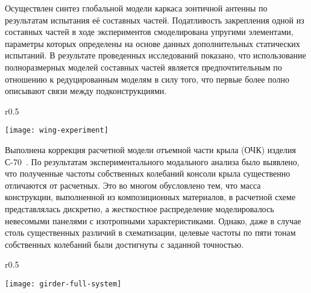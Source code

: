 Осуществлен синтез глобальной модели каркаса зонтичной антенны по результатам испытания её составных частей. Податливость закрепления одной из составных частей в ходе экспериментов смоделирована упругими элементами, параметры которых определены на основе данных дополнительных статических испытаний. В результате проведенных исследований показано, что использование полноразмерных моделей составных частей является предпочтительным по отношению к редуцированным моделям в силу того, что первые более полно описывают связи между подконструкциями. 

\begin{wrapfigure}[14]{r}{0.5\textwidth}
	\begin{center}
		\vspace{-3em}
		\texttt{[image: wing-experiment]} 
		 \label{fig:wing-experiment}
	\end{center}
\end{wrapfigure}

Выполнена коррекция расчетной модели отъемной части крыла (ОЧК) изделия \mbox{С-70}~. По результатам экспериментального модального анализа было выявлено, что полученные частоты собственных колебаний консоли крыла существенно отличаются от расчетных. Это во многом обусловлено тем, что масса конструкции, выполненной из композиционных материалов, в расчетной схеме представлялась дискретно, а жесткостное распределение моделировалось невесомыми панелями с изотропными характеристиками. \mbox{Однако}, даже в случае столь существенных различий в схематизации, целевые частоты по пяти тонам собственных колебаний были достигнуты с заданной точностью. 

\begin{wrapfigure}[13]{r}{0.5\textwidth}
	\begin{center}
		\vspace{-1.25em}
		\texttt{[image: girder-full-system]} 
		 \label{fig:girder-experiment}
	\end{center}
\end{wrapfigure}

